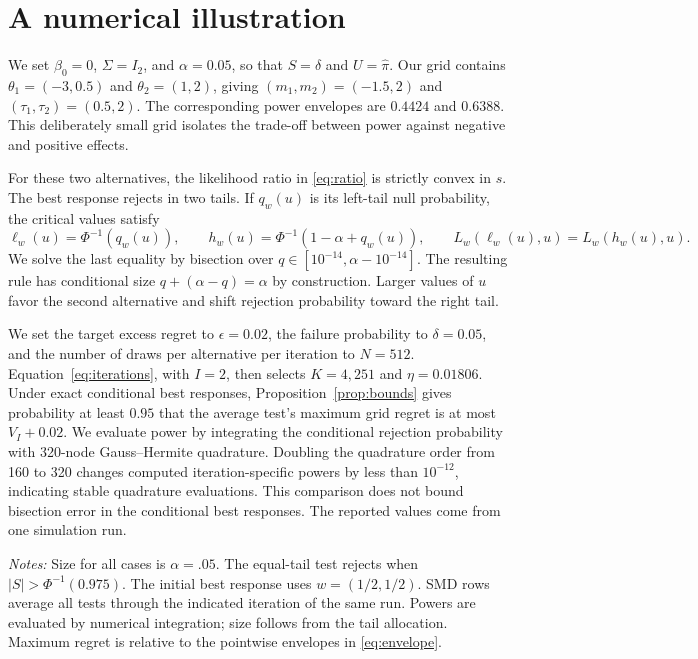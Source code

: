 \documentclass[11pt]{article}
\begin{document}
\section{A numerical illustration}\label{sec:example}

We set $\beta_0=0$, $\Sigma=I_2$, and $\alpha=0.05$, so that $S=\hat\delta$ and $U=\hat\pi$. Our grid contains $\theta_1=(-3,0.5)$ and $\theta_2=(1,2)$, giving $(m_1,m_2)=(-1.5,2)$ and $(\tau_1,\tau_2)=(0.5,2)$. The corresponding power envelopes are $0.4424$ and $0.6388$. This deliberately small grid isolates the trade-off between power against negative and positive effects.

For these two alternatives, the likelihood ratio in \eqref{eq:ratio} is strictly convex in $s$. The best response rejects in two tails. If $q_w(u)$ is its left-tail null probability, the critical values satisfy
\begin{equation}\label{eq:tailallocation} \ell_w(u)=\Phi^{-1}(q_w(u)),\qquad h_w(u)=\Phi^{-1}(1-\alpha+q_w(u)),\qquad L_w(\ell_w(u),u)=L_w(h_w(u),u). \end{equation}
We solve the last equality by bisection over $q\in[10^{-14},\alpha-10^{-14}]$. The resulting rule has conditional size $q+(\alpha-q)=\alpha$ by construction. Larger values of $u$ favor the second alternative and shift rejection probability toward the right tail.

We set the target excess regret to $\epsilon=0.02$, the failure probability to $\delta=0.05$, and the number of draws per alternative per iteration to $N=512$. Equation~\eqref{eq:iterations}, with $I=2$, then selects $K=4{,}251$ and $\eta=0.01806$. Under exact conditional best responses, Proposition~\ref{prop:bounds} gives probability at least $0.95$ that the average test's maximum grid regret is at most $V_I+0.02$. We evaluate power by integrating the conditional rejection probability with 320-node Gauss--Hermite quadrature. Doubling the quadrature order from 160 to 320 changes computed iteration-specific powers by less than $10^{-12}$, indicating stable quadrature evaluations. This comparison does not bound bisection error in the conditional best responses. The reported values come from one simulation run.

\begin{table}[t]
\centering
\caption{Power and regret on the two-alternative grid}\label{tab:example}
\small

\par\smallskip
\begin{minipage}{\linewidth}
\footnotesize\textit{Notes:} Size for all cases is $\alpha = .05$. The equal-tail test rejects when $|S|>\Phi^{-1}(0.975)$. The initial best response uses $w=(1/2,1/2)$. SMD rows average all tests through the indicated iteration of the same run. Powers are evaluated by numerical integration; size follows from the tail allocation. Maximum regret is relative to the pointwise envelopes in \eqref{eq:envelope}.
\end{minipage}
\end{table}
\end{document}
